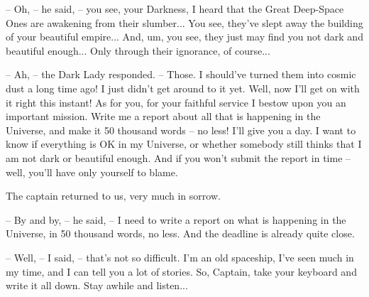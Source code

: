 \documentclass[ebook,oneside,final,openright]{memoir}
\begin{document}
– Oh, – he said, – you see, your Darkness, I heard that the Great Deep-Space Ones are awakening from their slumber... You see, they’ve slept away the building of your beautiful empire... And, um, you see, they just may find you not dark and beautiful enough... Only through their ignorance, of course...\par
– Ah, – the Dark Lady responded. – Those. I should’ve turned them into cosmic dust a long time ago! I just didn’t get around to it yet. Well, now I’ll get on with it right this instant! As for you, for your faithful service I bestow upon you an important mission. Write me a report about all that is happening in the Universe, and make it 50 thousand words – no less! I’ll give you a day. I want to know if everything is OK in my Universe, or whether somebody still thinks that I am not dark or beautiful enough. And if you won’t submit the report in time – well, you’ll have only yourself to blame.\par
\par
The captain returned to us, very much in sorrow.\par
– By and by, – he said, – I need to write a report on what is happening in the Universe, in 50 thousand words, no less. And the deadline is already quite close.\par
– Well, – I said, – that’s not so difficult. I’m an old spaceship, I’ve seen much in my time, and I can tell you a lot of stories. So, Captain, take your keyboard and write it all down. Stay awhile and listen...
\end{document}
